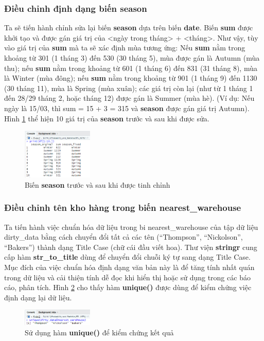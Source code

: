 \subsubsection{Điều chỉnh định dạng biến season}
Ta sẽ tiến hành chỉnh sửa lại biến \textbf{season} dựa trên biến \textbf{date}. Biến \textbf{sum} được khởi tạo và được gán giá trị của <ngày trong tháng> + <tháng>. Như vậy, tùy vào giá trị của \textbf{sum} mà ta sẽ xác định mùa tương ứng: Nếu \textbf{sum} nằm trong khoảng từ 301 (1 tháng 3) đến 530 (30 tháng 5), mùa được gán là Autumn (mùa thu); nếu \textbf{sum} nằm trong khoảng từ 601 (1 tháng 6) đến 831 (31 tháng 8), mùa là Winter (mùa đông); nếu \textbf{sum} nằm trong khoảng từ 901 (1 tháng 9) đến 1130 (30 tháng 11), mùa là Spring (mùa xuân); các giá trị còn lại (như từ 1 tháng 1 đến 28/29 tháng 2, hoặc tháng 12) được gán là Summer (mùa hè). (Ví dụ: Nếu ngày là 15/03, thì sum = 15 + 3  = 315 và \textbf{season} được gán giá trị Autumn). Hình \ref{f3} thể hiện 10 giá trị của \textbf{season} trước và sau khi được sửa.
\begin{figure}[!htbp]
    \centering
    \includegraphics[width=0.3\textwidth]{graphics/Pre_processing_data/f3.PNG}
    \caption{Biến \textbf{season} trước và sau khi được tinh chỉnh}
    \label{f3}
\end{figure}

\subsubsection{Điều chỉnh tên kho hàng trong biến nearest\_warehouse}

Ta tiến hành việc chuẩn hóa dữ liệu trong bi nearest\_warehouse của tập dữ liệu dirty\_data bằng cách chuyển đổi tất cả các tên (``Thompson'', ``Nickolson'',  ``Bakers'') thành dạng Title Case (chữ cái đầu viết hoa). Thư viện \textbf{stringr} cung cấp hàm \textbf{str\_to\_title} dùng để chuyển đổi chuỗi ký tự sang dạng Title Case. Mục đích của việc chuẩn hóa định dạng văn bản này là để tăng tính nhất quán trong dữ liệu và cải thiện tính dễ đọc khi hiển thị hoặc sử dụng trong các báo cáo, phân tích. Hình \ref{f4} cho thấy hàm \textbf{unique()} được dùng để kiểm chứng việc định dạng lại dữ liệu.
\begin{figure}[!htbp]
    \centering
    \includegraphics[width=0.3\textwidth]{graphics/Pre_processing_data/f4.PNG}
    \caption{Sử dụng hàm \textbf{unique()} để kiểm chứng kết quả}
    \label{f4}
\end{figure}

